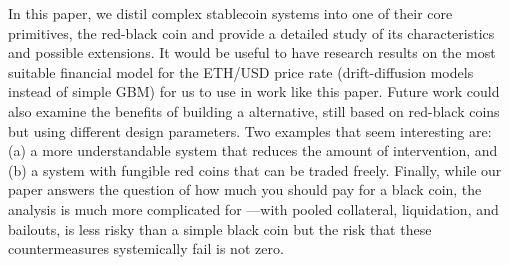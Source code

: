 In this paper, we distil complex stablecoin systems into one of their core primitives, the red-black coin and provide a detailed study of its characteristics and possible extensions. It would be useful to have research results on the most suitable financial model for the ETH/USD price rate (\eg drift-diffusion models instead of simple GBM) for us to use in work like this paper. Future work could also examine the benefits of building a \dai alternative, still based on red-black coins but using different design parameters. Two examples that seem interesting are: (a) a more understandable system that reduces the amount of intervention, and (b) a system with fungible red coins that can be traded freely. Finally, while our paper answers the question of how much you should pay for a black coin, the analysis is much more complicated for \dai---with pooled collateral, liquidation, and bailouts, \dai is less risky than a simple black coin but the risk that these countermeasures systemically fail is not zero.

